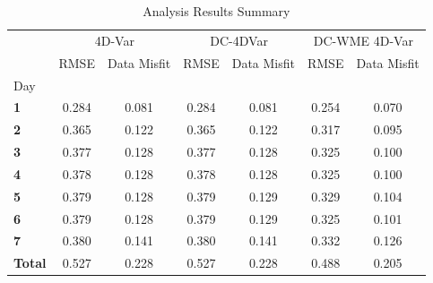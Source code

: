 \begin{table}[h!]
\caption{Analysis Results Summary}
\label{tab:error_results}
\begin{tabular}{l|cc|cc|cc}
\toprule
 & \multicolumn{2}{c}{4D-Var} & \multicolumn{2}{c}{DC-4DVar} & \multicolumn{2}{c}{DC-WME 4D-Var} \\
 & RMSE & Data Misfit & RMSE & Data Misfit & RMSE & Data Misfit \\
Day &  &  &  &  &  &  \\
\midrule
\textbf{1} & 0.284 & 0.081 & 0.284 & 0.081 & 0.254 & 0.070 \\
\textbf{2} & 0.365 & 0.122 & 0.365 & 0.122 & 0.317 & 0.095 \\
\textbf{3} & 0.377 & 0.128 & 0.377 & 0.128 & 0.325 & 0.100 \\
\textbf{4} & 0.378 & 0.128 & 0.378 & 0.128 & 0.325 & 0.100 \\
\textbf{5} & 0.379 & 0.128 & 0.379 & 0.129 & 0.329 & 0.104 \\
\textbf{6} & 0.379 & 0.128 & 0.379 & 0.129 & 0.325 & 0.101 \\
\textbf{7} & 0.380 & 0.141 & 0.380 & 0.141 & 0.332 & 0.126 \\
\textbf{Total} & 0.527 & 0.228 & 0.527 & 0.228 & 0.488 & 0.205 \\
\bottomrule
\end{tabular}
\end{table}
